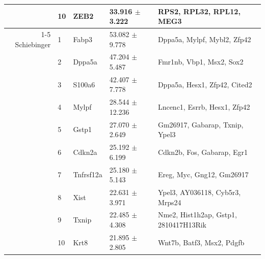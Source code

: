 \begin{table}[ht]
\begin{tabularx}{\textwidth}{r l l l X}
 & 10 & ZEB2 & 33.916 $\pm$ 3.222 & RPS2, RPL32, RPL12, MEG3 \\
\cmidrule{1-5}
Schiebinger & 1 & Fabp3 & 53.082 $\pm$ 9.778 & Dppa5a, Mylpf, Mybl2, Zfp42 \\
 & 2 & Dppa5a & 47.204 $\pm$ 5.487 & Fmr1nb, Vbp1, Msx2, Sox2 \\
 & 3 & S100a6 & 42.407 $\pm$ 7.778 & Dppa5a, Hesx1, Zfp42, Cited2 \\
 & 4 & Mylpf & 28.544 $\pm$ 12.236 & Lncenc1, Esrrb, Hesx1, Zfp42 \\
 & 5 & Gstp1 & 27.070 $\pm$ 2.649 & Gm26917, Gabarap, Txnip, Ypel3 \\
 & 6 & Cdkn2a & 25.192 $\pm$ 6.199 & Cdkn2b, Fos, Gabarap, Egr1 \\
 & 7 & Tnfrsf12a & 25.180 $\pm$ 5.143 & Ereg, Myc, Gng12, Gm26917 \\
 & 8 & Xist & 22.631 $\pm$ 3.971 & Ypel3, AY036118, Cyb5r3, Mrps24 \\
 & 9 & Txnip & 22.485 $\pm$ 4.308 & Nme2, Hist1h2ap, Gstp1, 2810417H13Rik \\
 & 10 & Krt8 & 21.895 $\pm$ 2.805 & Wnt7b, Batf3, Msx2, Pdgfb \\
\bottomrule
\end{tabularx}
\end{table}